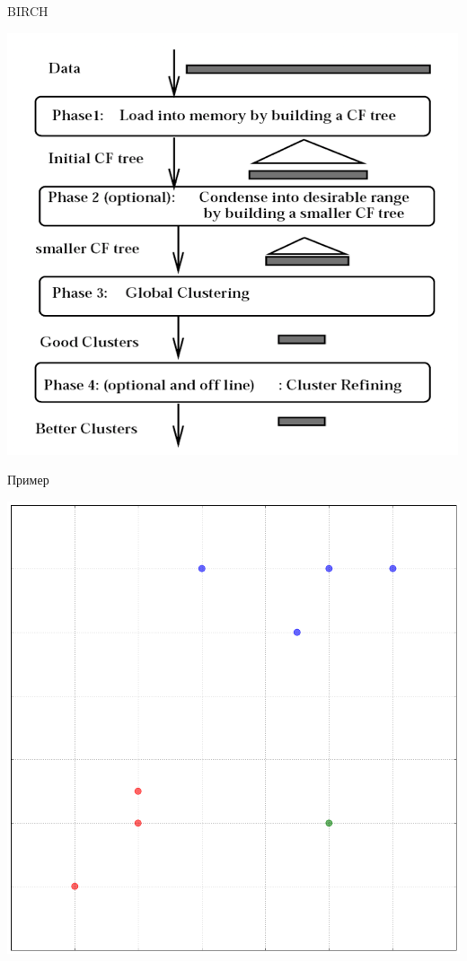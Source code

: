 \documentclass[aspectratio=169]{beamer}
\begin{document}
\begin{frame}{BIRCH}

\begin{center}
\includegraphics[height=0.9\textheight]{images/birch.png}
\end{center}

\end{frame}

\begin{frame}{Пример}

\begin{center}
\includegraphics[height=0.9\textheight]{images/toy.png}
\end{center}

\end{frame}
\end{document}

